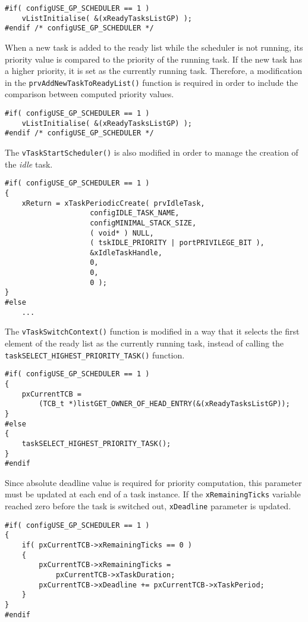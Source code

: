 \begin{lstlisting}[frame=none, label={init_lists}, caption={Initialization of the tasks in the \texttt{ready} list.}, captionpos=b]
#if( configUSE_GP_SCHEDULER == 1 )
	vListInitialise( &(xReadyTasksListGP) );
#endif /* configUSE_GP_SCHEDULER */
\end{lstlisting}
When a new task is added to the ready list while the scheduler is not running, its priority value is compared to the priority of the running task. 
If the new task has a higher priority, it is set as the currently running task.
Therefore, a modification in the \verb$prvAddNewTaskToReadyList()$ function is required in order to include the comparison between computed priority values. 
\begin{lstlisting}[frame=none, label={newtask}, caption={Modification of the \texttt{prvAddNewTaskToReadyList()} function.}, captionpos=b]
#if( configUSE_GP_SCHEDULER == 1 )
	vListInitialise( &(xReadyTasksListGP) );
#endif /* configUSE_GP_SCHEDULER */
\end{lstlisting}
The \verb$vTaskStartScheduler()$ is also modified in order to manage the creation of the \textit{idle} task.
\begin{lstlisting}[frame=none, label={idle}, caption={Creation of the \textit{idle} task.}, captionpos=b]
#if( configUSE_GP_SCHEDULER == 1 )
{
	xReturn = xTaskPeriodicCreate( prvIdleTask,
					configIDLE_TASK_NAME,
					configMINIMAL_STACK_SIZE,
					( void* ) NULL,
					( tskIDLE_PRIORITY | portPRIVILEGE_BIT ),
					&xIdleTaskHandle,
					0,
					0,
					0 );
}
#else 
	...
\end{lstlisting}
The \verb$vTaskSwitchContext()$ function is modified in a way that it selects the first element of the ready list as the currently running task, instead of calling the \\\verb$taskSELECT_HIGHEST_PRIORITY_TASK()$ function.
\begin{lstlisting}[frame=none, label={switchcontext}, caption={\texttt{vTaskSwitchContext()} modification.}, captionpos=b]
#if( configUSE_GP_SCHEDULER == 1 )
{
	pxCurrentTCB =
		(TCB_t *)listGET_OWNER_OF_HEAD_ENTRY(&(xReadyTasksListGP));
}
#else 
{
	taskSELECT_HIGHEST_PRIORITY_TASK();
}
#endif
\end{lstlisting} 
Since absolute deadline value is required for priority computation, this parameter must be updated at each end of a task instance.
If the \verb$xRemainingTicks$ variable reached zero before the task is switched out, \verb$xDeadline$ parameter is updated.
\begin{lstlisting}[frame=none, label={taskfinish}, caption={\texttt{Updating the \texttt{xDeadline} parameter at the end of task instance}.}, captionpos=b]
#if( configUSE_GP_SCHEDULER == 1 )
{
	if( pxCurrentTCB->xRemainingTicks == 0 ) 
	{
		pxCurrentTCB->xRemainingTicks = 
			pxCurrentTCB->xTaskDuration;
		pxCurrentTCB->xDeadline += pxCurrentTCB->xTaskPeriod;
	}
}
#endif
\end{lstlisting}
